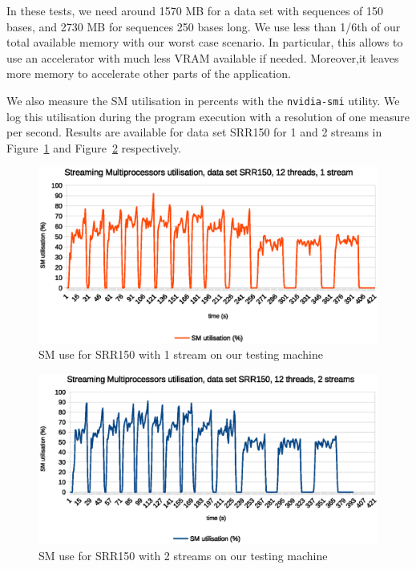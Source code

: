 In these tests, we need around 1570 MB for a data set with sequences of 150 bases, and 2730 MB for sequences 250 bases long. We use less than 1/6th of our total available memory with our worst case scenario. In particular, this allows to use an accelerator with much less VRAM available if needed. Moreover,it leaves more memory to accelerate other parts of the application.

We also measure the SM utilisation in percents with the \verb|nvidia-smi| utility. We log this utilisation during the program execution with a resolution of one measure per second. Results are available for data set SRR150 for 1 and 2 streams in Figure~\ref{fig:sm-use-srr150-1str} and Figure~\ref{fig:sm-use-srr150-2str} respectively.

\begin{figure}[h]
	\centering
	\includegraphics[width=0.9\linewidth]{SM_utilisation_12threads1stream}
	\caption{SM use for SRR150 with 1 stream on our testing machine}
	\label{fig:sm-use-srr150-1str}
\end{figure}

\begin{figure}[h]
	\centering
	\includegraphics[width=0.9\linewidth]{SM_utilisation_12threads2streams}
	\caption{SM use for SRR150 with 2 streams on our testing machine}
	\label{fig:sm-use-srr150-2str}
\end{figure}

